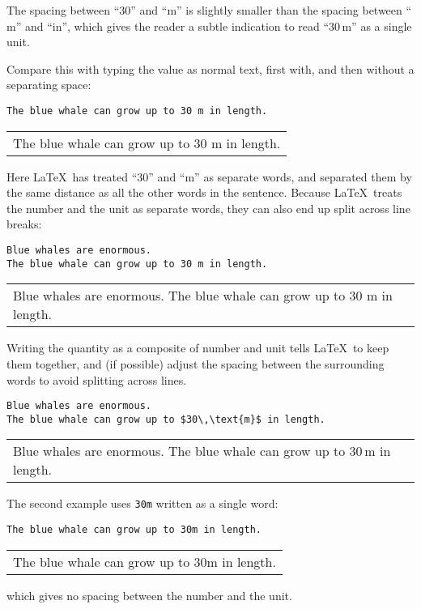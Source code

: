 \documentclass[a4paper]{tufte-handout}
\begin{document}
The spacing between ``$30$'' and ``$\text{m}$'' is slightly smaller than the spacing between ``$\text{m}$'' and ``in'', which gives the reader a subtle indication to read ``$30\,\text{m}$'' as a single unit.

Compare this with typing the value as normal text, first with, and then without a separating space:
\begin{lstlisting}
The blue whale can grow up to 30 m in length.
\end{lstlisting}
\begin{tabular}{|p{10cm}}
The blue whale can grow up to 30 m in length.
\end{tabular}

Here \LaTeX\ has treated ``$30$'' and ``$\text{m}$'' as separate words, and separated them by the same distance as all the other words in the sentence. Because \LaTeX\ treats the number and the unit as separate words, they can also end up split across line breaks:

\begin{lstlisting}
Blue whales are enormous. 
The blue whale can grow up to 30 m in length.
\end{lstlisting}
\begin{tabular}{|p{10cm}}
Blue whales are enormous. The blue whale can grow up to 30 m in length.
\end{tabular}

Writing the quantity as a composite of number and unit tells \LaTeX\ to keep them together, and (if possible) adjust the spacing between the surrounding words to avoid splitting across lines.
\begin{lstlisting}
Blue whales are enormous. 
The blue whale can grow up to $30\,\text{m}$ in length.
\end{lstlisting}
\begin{tabular}{|p{10cm}}
Blue whales are enormous. The blue whale can grow up to $30\,\text{m}$ in length.
\end{tabular}

The second example uses \lstinline{30m} written as a single word:
\begin{lstlisting}
The blue whale can grow up to 30m in length.
\end{lstlisting}
\begin{tabular}{|p{10cm}}
The blue whale can grow up to 30m in length.
\end{tabular}

which gives no spacing between the number and the unit.
\end{document}
